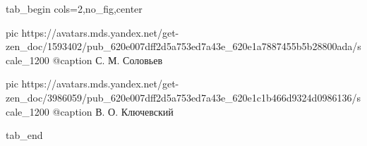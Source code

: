  
 
 
 
 


\ifcmt
  tab_begin cols=2,no_fig,center

     pic https://avatars.mds.yandex.net/get-zen_doc/1593402/pub_620e007dff2d5a753ed7a43e_620e1a7887455b5b28800ada/scale_1200
		 @caption С. М. Соловьев

		 pic https://avatars.mds.yandex.net/get-zen_doc/3986059/pub_620e007dff2d5a753ed7a43e_620e1c1b466d9324d0986136/scale_1200
		 @caption В. О. Ключевский

  tab_end
\fi
